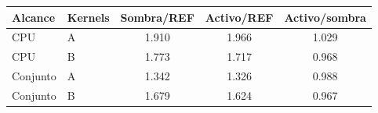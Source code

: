 \begin{tabular}{@{}llccc@{}}
\toprule
\textbf{Alcance} & \textbf{Kernels} & \textbf{Sombra/REF} & \textbf{Activo/REF} & \textbf{Activo/sombra} \\
\midrule
CPU & A & 1.910 & 1.966 & 1.029 \\
CPU & B & 1.773 & 1.717 & 0.968 \\
Conjunto & A & 1.342 & 1.326 & 0.988 \\
Conjunto & B & 1.679 & 1.624 & 0.967 \\
\bottomrule
\end{tabular}
